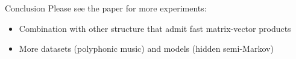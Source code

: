 \documentclass{beamer}
\newlength{\onecolwid}
\begin{document}
\begin{frame}
\begin{columns}[t]
\begin{column}{\onecolwid}
\begin{block}{Conclusion}
Please see the paper for more experiments:
\begin{itemize}
\item Combination with other structure that admit fast matrix-vector products
\item More datasets (polyphonic music) and models (hidden semi-Markov)
\end{itemize}

\end{block}






\end{column} %

\end{columns} %

\end{frame}
\end{document}
